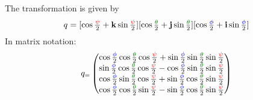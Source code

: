 The transformation is given by
\begin{equation}
\quat{} = [\cos \tfrac{\Yaw}{2} + \mathbf{k} \sin \tfrac{\Yaw}{2}][\cos \tfrac{\Pitch}{2} + \mathbf{j} \sin \tfrac{\Pitch}{2}][\cos \tfrac{\Roll}{2} + \mathbf{i} \sin \tfrac{\Roll}{2}]
\end{equation}
In matrix notation:
\begin{equation}
\quat = \begin{pmatrix}
\cos \tfrac{\Roll}{2} \cos \tfrac{\Pitch}{2} \cos \tfrac{\Yaw}{2} + \sin \tfrac{\Roll}{2} \sin \tfrac{\Pitch}{2} \sin \tfrac{\Yaw}{2} \\
\sin \tfrac{\Roll}{2} \cos \tfrac{\Pitch}{2} \cos \tfrac{\Yaw}{2} - \cos \tfrac{\Roll}{2} \sin \tfrac{\Pitch}{2} \sin \tfrac{\Yaw}{2} \\
\cos \tfrac{\Roll}{2} \sin \tfrac{\Pitch}{2} \cos \tfrac{\Yaw}{2} + \sin \tfrac{\Roll}{2} \cos \tfrac{\Pitch}{2} \sin \tfrac{\Yaw}{2} \\
\cos \tfrac{\Roll}{2} \cos \tfrac{\Pitch}{2} \sin \tfrac{\Yaw}{2} - \sin \tfrac{\Roll}{2} \cos \tfrac{\Pitch}{2} \sin \tfrac{\Yaw}{2}
\end{pmatrix}
\end{equation}
